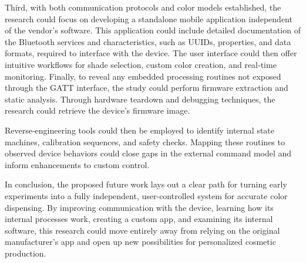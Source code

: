 Third, with both communication protocols and color models established, the research could focus on developing a standalone mobile application independent of the vendor’s software. This application could include detailed documentation of the Bluetooth services and characteristics, such as UUIDs, properties, and data formats, required to interface with the device. The user interface could then offer intuitive workflows for shade selection, custom color creation, and real‑time monitoring.
Finally, to reveal any embedded processing routines not exposed through the GATT interface, the study could perform firmware extraction and static analysis. Through hardware teardown and debugging techniques, the research could retrieve the device’s firmware image. 

Reverse‑engineering tools could then be employed to identify internal state machines, calibration sequences, and safety checks. Mapping these routines to observed device behaviors could close gaps in the external command model and inform enhancements to custom control.

In conclusion, the proposed future work lays out a clear path for turning early experiments into a fully independent, user-controlled system for accurate color dispensing. By improving communication with the device, learning how its internal processes work, creating a custom app, and examining its internal software, this research could move entirely away from relying on the original manufacturer’s app and open up new possibilities for personalized cosmetic production.
